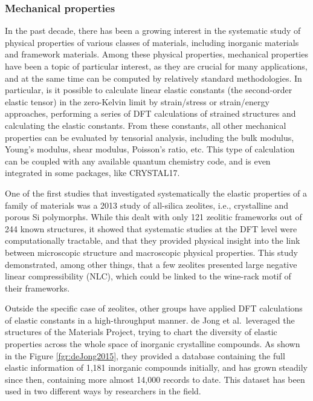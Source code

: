 \documentclass[main.tex]{subfiles}
\begin{document}
\subsubsection{Mechanical properties}

In the past decade, there has been a growing interest in the systematic study of physical properties of various classes of materials, including inorganic materials and framework materials. Among these physical properties, mechanical properties have been a topic of particular interest, as they are crucial for many applications, and at the same time can be computed by relatively standard methodologies. In particular, is it possible to calculate linear elastic constants (the second-order elastic tensor) in the zero-Kelvin limit by strain/stress or strain/energy approaches, performing a series of DFT calculations of strained structures and calculating the elastic constants. From these constants, all other mechanical properties can be evaluated by tensorial analysis,\cite{Marmier_2010} including the bulk modulus, Young's modulus, shear modulus, Poisson's ratio, etc. This type of calculation can be coupled with any available quantum chemistry code,\cite{Golesorkhtabar_2013} and is even integrated in some packages, like CRYSTAL17.\cite{Dovesi_2018}

One of the first studies that investigated systematically the elastic properties of a family of materials was a 2013 study of all-silica zeolites,\cite{Coudert_2013} i.e., crystalline and porous Si polymorphs. While this dealt with only 121 zeolitic frameworks out of 244 known structures, it showed that systematic studies at the DFT level were computationally tractable, and that they provided physical insight into the link between microscopic structure and macroscopic physical properties. This study demonstrated, among other things, that a few zeolites presented large negative linear compressibility (NLC), which could be linked to the wine-rack motif of their frameworks.

Outside the specific case of zeolites, other groups have applied DFT calculations of elastic constants in a high-throughput manner. de Jong et al.\ leveraged the structures of the Materials Project\cite{Matgenome, Jain_2013}, trying to chart the diversity of elastic properties across the whole space of inorganic crystalline compounds.\cite{deJong_2015} As shown in the Figure \ref{fgr:deJong2015}, they provided a database containing the full elastic information of 1,181 inorganic compounds initially, and has grown steadily since then, containing more almost 14,000 records to date.\cite{MaterialsProject} This dataset has been used in two different ways by researchers in the field.
\end{document}
